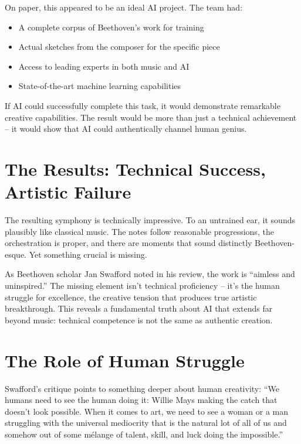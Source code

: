 \documentclass[
  Letterpaper,
]{scrbook}
\providecommand{\tightlist}{%
  \setlength{\itemsep}{0pt}\setlength{\parskip}{0pt}}\usepackage{longtable,booktabs,array}
\begin{document}
On paper, this appeared to be an ideal AI project. The team had:

\begin{itemize}
\tightlist
\item
  A complete corpus of Beethoven's work for training
\item
  Actual sketches from the composer for the specific piece
\item
  Access to leading experts in both music and AI
\item
  State-of-the-art machine learning
  capabilities
\end{itemize}

If AI could successfully complete this task, it would demonstrate
remarkable creative capabilities. The result would be more than just a
technical achievement -- it would show that AI could authentically
channel human genius.

\section{The Results: Technical Success, Artistic
Failure}\label{the-results-technical-success-artistic-failure}

The resulting symphony is technically impressive. To an untrained ear,
it sounds plausibly like classical music. The notes follow reasonable
progressions, the orchestration is proper, and there are moments that
sound distinctly Beethoven-esque. Yet something crucial is missing.

As Beethoven scholar Jan Swafford noted in his review, the work is
``aimless and uninspired.'' The missing element isn't technical
proficiency -- it's the human struggle for excellence, the creative
tension that produces true artistic breakthrough. This reveals a
fundamental truth about AI that extends far beyond music: technical
competence is not the same as authentic creation.

\section{The Role of Human Struggle}\label{the-role-of-human-struggle}

Swafford's critique points to something deeper about human creativity:
``We humans need to see the human doing it: Willie Mays making the catch
that doesn't look possible. When it comes to art, we need to see a woman
or a man struggling with the universal mediocrity that is the natural
lot of all of us and somehow out of some mélange of talent, skill, and
luck doing the impossible.''
\end{document}
